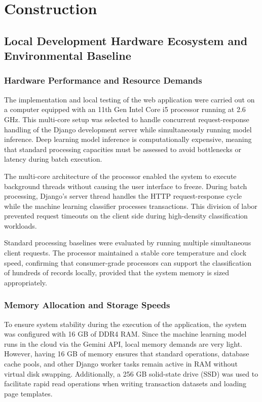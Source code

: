 \chapter{Construction}

\section{Local Development Hardware Ecosystem and Environmental Baseline}
\subsection{Hardware Performance and Resource Demands}
The implementation and local testing of the web application were carried out on a computer equipped with an 11th Gen Intel Core i5 processor running at 2.6 GHz. This multi-core setup was selected to handle concurrent request-response handling of the Django development server while simultaneously running model inference. Deep learning model inference is computationally expensive, meaning that standard processing capacities must be assessed to avoid bottlenecks or latency during batch execution.

The multi-core architecture of the processor enabled the system to execute background threads without causing the user interface to freeze. During batch processing, Django's server thread handles the HTTP request-response cycle while the machine learning classifier processes transactions. This division of labor prevented request timeouts on the client side during high-density classification workloads.

Standard processing baselines were evaluated by running multiple simultaneous client requests. The processor maintained a stable core temperature and clock speed, confirming that consumer-grade processors can support the classification of hundreds of records locally, provided that the system memory is sized appropriately.

\subsection{Memory Allocation and Storage Speeds}
To ensure system stability during the execution of the application, the system was configured with 16 GB of DDR4 RAM. Since the machine learning model runs in the cloud via the Gemini API, local memory demands are very light. However, having 16 GB of memory ensures that standard operations, database cache pools, and other Django worker tasks remain active in RAM without virtual disk swapping. Additionally, a 256 GB solid-state drive (SSD) was used to facilitate rapid read operations when writing transaction datasets and loading page templates.

